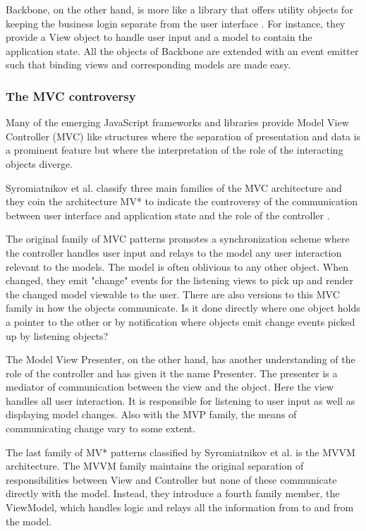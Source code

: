 \documentclass[english]{ifimaster}
\begin{document}
Backbone, on the other hand, is more like a library that offers utility objects for keeping the business login separate from the user interface \parencite{backbone}. For instance, they provide a View object to handle user input and a model to contain the application state. All the objects of Backbone are extended with an event emitter such that binding views and corresponding models are made easy.


\subsubsection{The MVC controversy}
\label{sec:mvc}
Many of the emerging JavaScript frameworks and libraries provide Model View Controller (MVC) like structures where the separation of presentation and data is a prominent feature but where the interpretation of the role of the interacting objects diverge. 

Syromiatnikov et al. classify three main families of the MVC architecture and they coin the architecture MV* to indicate the controversy of the communication between user interface and application state and the role of the controller \parencite{syromiatnikov}. 

The original family of MVC patterns promotes a synchronization scheme where the controller handles user input and relays to the model any user interaction relevant to the models. The model is often oblivious to any other object. When changed, they emit "change" events for the listening views to pick up and render the changed model viewable to the user. There are also versions to this MVC family in how the objects communicate. Is it done directly where one object holds a pointer to the other or by notification where objects emit change events picked up by listening objects? 

The Model View Presenter, on the other hand, has another understanding of the role of the controller and has given it the name Presenter. The presenter is a mediator of communication between the view and the object. Here the view handles all user interaction. It is responsible for listening to user input as well as displaying model changes. Also with the MVP family, the means of communicating change vary to some extent.

The last family of MV* patterns classified by Syromiatnikov et al. is the MVVM architecture. The MVVM family maintains the original separation of responsibilities between View and Controller but none of these communicate directly with the model. Instead, they introduce a fourth family member, the ViewModel, which handles logic and relays all the information from to and from the model.
\end{document}
